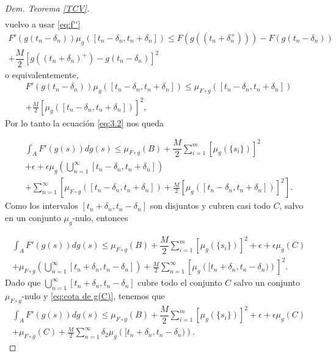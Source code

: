 \begin{proof}[Dem. Teorema \eqref{TCV}]
\begin{multline*}
\end{multline*}
vuelvo a usar \eqref{eq:f''}
\begin{multline*}
F'(g(t_n-\delta_n))\mu_{g}([t_n-\delta_n,t_n+\delta_n] ) \leq F(g((t_n+\delta_n^+)))-F(g(t_n-\delta_n))\\+\dfrac{M}{2}\left[g((t_n+\delta_n)^+)-g(t_n-\delta_n) \right]^2
\end{multline*}
o equivalentemente,
\begin{multline*}
F'(g(t_n-\delta_n))\mu_{g}([t_n-\delta_n,t_n+\delta_n] )\leq \mu_{F\circ g}\left( [t_n-\delta_n,t_n+\delta_n]\right)\\ +\frac{M}{2}\left[\mu_{g}\left( [t_n-\delta_n,t_n+\delta_n]\right) \right]^2,
\end{multline*}
Por lo tanto la ecuación \eqref{eq:3.2} nos queda


\begin{multline*}
		\int_{A}F'(g(s))dg(s)  \leq \mu_{F\circ g}(B)+\dfrac{M}{2}\sum_{i=1}^{m} \left[ \mu_{g}(\{s_i\})\right]^2\\
   +\epsilon+\epsilon\mu_{g}\left(\bigcup_{n=1}^{\infty}[t_n-\delta_n, t_n+\delta_n]\right) \\+ \sum_{n=1}^{\infty}\left[ \mu_{F\circ g}\left( [t_n-\delta_n,t_n+\delta_n]\right) +\frac{M}{2}\left[\mu_{g}\left( [t_n-\delta_n,t_n+\delta_n]\right) \right]^2 \right] .
\end{multline*}
Como los intervalos $[t_n+\delta_n,t_n-\delta_n]$ son disjuntos y cubren casi todo $C$, salvo en un conjunto $\mu_g$-nulo, entonces

\begin{multline*}
	\int_{A}F'(g(s))dg(s) \leq \mu_{F\circ g}(B)+\dfrac{M}{2}\sum_{i=1}^{m} \left[ \mu_{g}(\{s_i\})\right] ^2+\epsilon+\epsilon\mu_{g}\left(C\right) \\+ \mu_{F\circ g}\left(\bigcup_{n=1}^{\infty} [t_n+\delta_n,t_n-\delta_n]\right) +\frac{M}{2}
	\sum_{n=1}^{\infty}\left[\mu_{g}\left( [t_n+\delta_n,t_n-\delta_n)\right) \right]^2 .
\end{multline*} 
Dado que    $\bigcup_{n=1}^{\infty} [t_n+\delta_n,t_n-\delta_n]$ cubre todo el conjunto $C$ salvo un conjunto $\mu_{F\circ g}$-nulo y \eqref{eq:cota de g(C)},  tenemos que 
\begin{multline*}
	\int_{A}F'(g(s))dg(s) \leq \mu_{F\circ g}(B)+\dfrac{M}{2}\sum_{i=1}^{m} \left[ \mu_{g}(\{s_i\})\right] ^2+\epsilon+\epsilon\mu_{g}\left(C\right) \\+ \mu_{F\circ g}\left(C\right) +\frac{M}{2}
	\sum_{n=1}^{\infty}\delta_2 \mu_{g}\left( [t_n+\delta_n,t_n-\delta_n)\right).
\end{multline*} \label{eq:3.3}


\end{proof}
